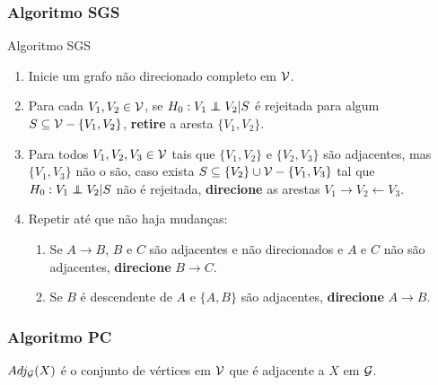 \subsubsection{Algoritmo SGS}

\begin{algorithm2}
 Algoritmo SGS
 \begin{enumerate}
  \item Inicie um grafo não direcionado completo em ${\mathcal V}$.
  \item Para cada $V_1, V_2 \in {\mathcal V}$, 
  se $H_0: V_1 \perp\!\!\!\!\perp V_2 | S$ é rejeitada para
  algum $S \subseteq {\mathcal V} - \{V_1,V_2\}$, \textbf{retire}
  a aresta $\{V_1,V_2\}$.
  \item Para todos $V_1, V_2, V_3 \in {\mathcal V}$ tais que
  $\{V_1, V_2\}$ e $\{V_2,V_3\}$ são adjacentes, mas $\{V_1, V_3\}$ não o são,
  caso exista $S \subseteq \{V_2\} \cup {\mathcal V}-\{V_1,V_3\}$ tal que
  $H_0: V_1 \perp\!\!\!\!\perp V_2 | S$ não é rejeitada, 
  \textbf{direcione} as arestas
  $V_1 \rightarrow V_2 \leftarrow V_3$.
  \item Repetir até que não haja mudanças:
  \begin{enumerate}[label=(\alph*)]
   \item Se $A \rightarrow B$, 
   $B$ e $C$ são adjacentes e não direcionados e
   $A$ e $C$ não são adjacentes, 
   \textbf{direcione} $B \rightarrow C$.
   \item Se $B$ é descendente de $A$ e 
   $\{A,B\}$ são adjacentes,
   \textbf{direcione} $A \rightarrow B$.
  \end{enumerate}
 \end{enumerate}
\end{algorithm2}

\subsubsection{Algoritmo PC}

\begin{definition}
 $Adj_{{\mathcal G}}(X)$ é o conjunto de vértices em ${\mathcal V}$ que
 é adjacente a $X$ em ${\mathcal G}$.
\end{definition}

